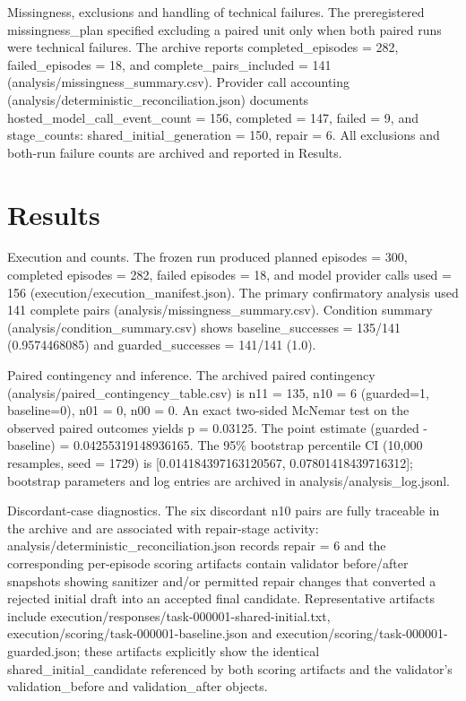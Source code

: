 \documentclass[conference]{IEEEtran}
\begin{document}
Missingness, exclusions and handling of technical failures. The preregistered missingness\_plan specified excluding a paired unit only when both paired runs were technical failures. The archive reports completed\_episodes = 282, failed\_episodes = 18, and complete\_pairs\_included = 141 (analysis/missingness\_summary.csv). Provider call accounting (analysis/deterministic\_reconciliation.json) documents hosted\_model\_call\_event\_count = 156, completed = 147, failed = 9, and stage\_counts: shared\_initial\_generation = 150, repair = 6. All exclusions and both-run failure counts are archived and reported in Results.

\section{Results}
Execution and counts. The frozen run produced planned episodes = 300, completed episodes = 282, failed episodes = 18, and model provider calls used = 156 (execution/execution\_manifest.json). The primary confirmatory analysis used 141 complete pairs (analysis/missingness\_summary.csv). Condition summary (analysis/condition\_summary.csv) shows baseline\_successes = 135/141 (0.9574468085) and guarded\_successes = 141/141 (1.0).

Paired contingency and inference. The archived paired contingency (analysis/paired\_contingency\_table.csv) is n11 = 135, n10 = 6 (guarded=1, baseline=0), n01 = 0, n00 = 0. An exact two-sided McNemar test on the observed paired outcomes yields p = 0.03125. The point estimate (guarded - baseline) = 0.04255319148936165. The 95\% bootstrap percentile CI (10,000 resamples, seed = 1729) is [0.014184397163120567, 0.07801418439716312]; bootstrap parameters and log entries are archived in analysis/analysis\_log.jsonl.

Discordant-case diagnostics. The six discordant n10 pairs are fully traceable in the archive and are associated with repair-stage activity: analysis/deterministic\_reconciliation.json records repair = 6 and the corresponding per-episode scoring artifacts contain validator before/after snapshots showing sanitizer and/or permitted repair changes that converted a rejected initial draft into an accepted final candidate. Representative artifacts include execution/responses/task-000001-shared-initial.txt, execution/scoring/task-000001-baseline.json and execution/scoring/task-000001-guarded.json; these artifacts explicitly show the identical shared\_initial\_candidate referenced by both scoring artifacts and the validator's validation\_before and validation\_after objects.
\end{document}
